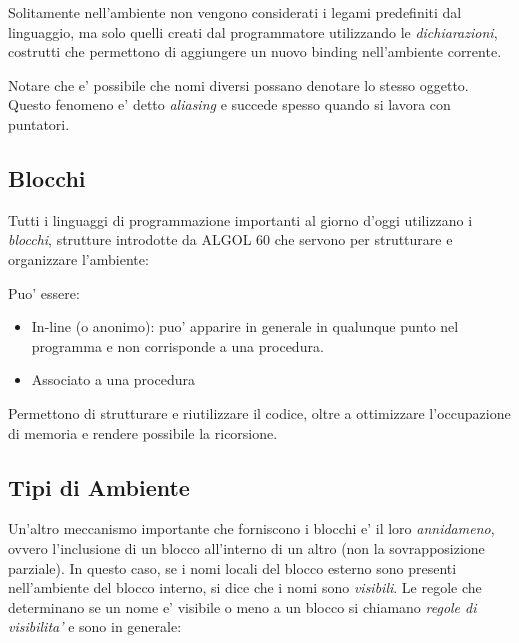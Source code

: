 
Solitamente nell'ambiente non vengono considerati i legami predefiniti dal linguaggio, ma solo quelli creati dal programmatore utilizzando le \textit{dichiarazioni}, costrutti che permettono di aggiungere un nuovo binding nell'ambiente corrente.

Notare che e' possibile che nomi diversi possano denotare lo stesso oggetto. Questo fenomeno e' detto \textit{aliasing} e succede spesso quando si lavora con puntatori.

\subsection{Blocchi}

Tutti i linguaggi di programmazione importanti al giorno d'oggi utilizzano i \textit{blocchi}, strutture introdotte da ALGOL 60 che servono per strutturare e organizzare l'ambiente:


Puo' essere:
\begin{itemize}
  \item In-line (o anonimo): puo' apparire in generale in qualunque punto nel programma e non corrisponde a una procedura. 
\item Associato a una procedura 
\end{itemize}

Permettono di strutturare e riutilizzare il codice, oltre a ottimizzare l'occupazione di memoria e rendere possibile la ricorsione. 

\subsection{Tipi di Ambiente}

Un'altro meccanismo importante che forniscono i blocchi e' il loro \textit{annidameno}, ovvero l'inclusione di un blocco all'interno di un altro (non la sovrapposizione parziale). In questo caso, se i nomi locali del blocco esterno sono presenti nell'ambiente del blocco interno, si dice che i nomi sono \textit{visibili}. Le regole che determinano se un nome e' visibile o meno a un blocco si chiamano \textit{regole di visibilita'} e sono in generale:

